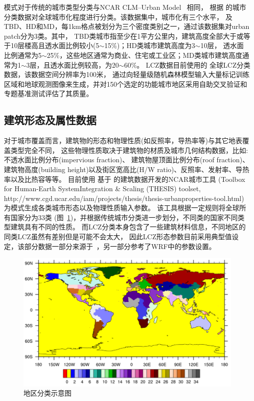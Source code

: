 模式对于传统的城市类型分类与NCAR CLM--Urban Model~\citep{oleson2020parameterization} 相同，
根据 \citet{jackson2013parameterization} 的城市分类数据对全球城市化程度进行分类。该数据集中，城市化有三个水平，
及TBD、HD和MD，每1km格点被划分为三个密度类别之一，通过该数据集对urban patch分为3类。其中，
TBD类城市指至少在1平方公里内，建筑高度全部大于或等于10层楼高且透水面比例较小(5$\sim$15\%)；HD类城市建筑高度为3$\sim$10层，
透水面比例通常为5$\sim$25\%，这些地区通常为商业、住宅或工业区；MD类城市建筑高度通常为1$\sim$3层，且透水面比例较高，为20$\sim$60\%。
LCZ数据目前使用的 \citet{demuzere2022global} 全球LCZ分类数据，该数据空间分辨率为100米，
通过向轻量级随机森林模型输入大量标记训练区域和地球观测图像来生成，并对150个选定的功能城市地区采用自助交叉验证和专题基准测试评估了其质量。

\subsection{建筑形态及属性数据}\label{建筑形态及属性数据}
对于城市覆盖而言，建筑物的形态和物理性质(如反照率，导热率等)与其它地表覆盖类型完全不同，
这些物理性质取决于建筑物的材质及城市几何结构数据，比如: 不透水面比例分布(impervious fraction)、
建筑物屋顶面比例分布(roof fraction)、建筑物高度(building height)以及街区宽高比(H/W ratio)、反照率、发射率、导热率以及比热容等等。
目前使用 \citet{oleson2020parameterization} 基于 \citet{jackson2013parameterization} 的建筑数据开发的NCAR城市工具
(Toolbox for Human-Earth SystemIntegration \& Scaling (THESIS) toolset, http://www.cgd.ucar.edu/iam/projects/thesis/thesis-urbanproperties-tool.html)
为模式生成各类城市形态以及物理性质输入参数。
该工具根据一定规则将全球所有国家分为33类 (图~\ref{fig:地区分类})，并根据传统城市分类进一步划分，不同类的国家不同类型建筑具有不同的性质。
%
而LCZ分类本身包含了一些建筑材料信息，不同地区的同类LCZ虽然有差别但是可能不会太大，
因此LCZ形态参数目前采用典型值设定，该部分数据一部分来源于~\citet{stewart2014evaluation}，另一部分参考了WRF中的参数设置。
{
\begin{figure}[]
\centering
\includegraphics{Figures/地表输入数据/地区分类.png}
\caption{地区分类示意图}
\label{fig:地区分类}
\end{figure}
}


